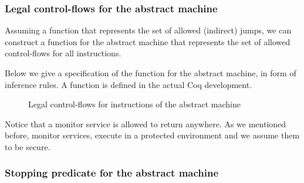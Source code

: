 \subsubsection{Legal control-flows for the abstract machine}
\label{sec:abstract_flow}

Assuming a function \CFG that represents the set of allowed (indirect) jumps,
we can construct a function \SUCC for the abstract machine that represents
the set of allowed control-flows for all instructions.

Below we give a specification of the \SUCC function for the abstract machine,
in form of inference rules. A function is defined in the actual Coq development.

\begin{figure}[!htpb]
\bigskip

\bigskip

\bigskip

\caption{Legal control-flows for instructions of the abstract machine}
\end{figure}

Notice that a monitor service is allowed to return anywhere. As we mentioned
before, monitor services, execute in a protected environment and we assume them
to be secure.

\subsubsection{Stopping predicate for the abstract machine}
\label{sec:abstract_stopping}

